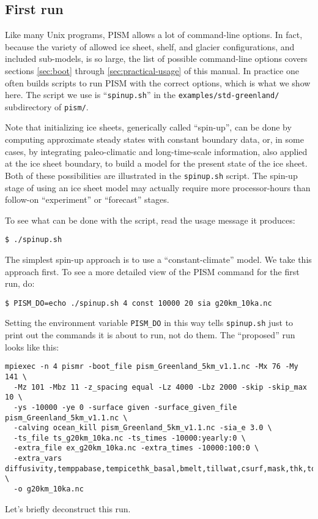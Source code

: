 \subsection{First run}   \label{subsect:runscript}  Like many Unix programs, PISM allows a lot of command-line options.  In fact, because the variety of allowed ice sheet, shelf, and glacier configurations, and included sub-models, is so large, the list of possible command-line options covers sections \ref{sec:boot} through \ref{sec:practical-usage} of this manual.  In practice one often builds scripts to run PISM with the correct options, which is what we show here.  The script we use is ``\texttt{spinup.sh}'' in the \texttt{examples/std-greenland/} subdirectory of \texttt{pism/}.

Note that initializing ice sheets, generically called ``spin-up'', can be done by computing approximate steady states with constant boundary data, or, in some cases, by integrating paleo-climatic and long-time-scale information, also applied at the ice sheet boundary, to build a model for the present state of the ice sheet.  Both of these possibilities are illustrated in the \texttt{spinup.sh} script.  The spin-up stage of using an ice sheet model may actually require more processor-hours than follow-on ``experiment'' or ``forecast'' stages.

To see what can be done with the script, read the usage message it produces:
\begin{verbatim}
$ ./spinup.sh
\end{verbatim}

The simplest spin-up approach is to use a ``constant-climate'' model.  We take this approach first.  To see a more detailed view of the PISM command for the first run, do:
\begin{verbatim}
$ PISM_DO=echo ./spinup.sh 4 const 10000 20 sia g20km_10ka.nc
\end{verbatim}
Setting the environment variable \texttt{PISM_DO} in this way tells \texttt{spinup.sh} just to print out the commands it is about to run, not do them.  The ``proposed'' run looks like this:
\label{firstcommand}
\small
\begin{verbatim}
mpiexec -n 4 pismr -boot_file pism_Greenland_5km_v1.1.nc -Mx 76 -My 141 \
  -Mz 101 -Mbz 11 -z_spacing equal -Lz 4000 -Lbz 2000 -skip -skip_max 10 \
  -ys -10000 -ye 0 -surface given -surface_given_file pism_Greenland_5km_v1.1.nc \
  -calving ocean_kill pism_Greenland_5km_v1.1.nc -sia_e 3.0 \
  -ts_file ts_g20km_10ka.nc -ts_times -10000:yearly:0 \
  -extra_file ex_g20km_10ka.nc -extra_times -10000:100:0 \
  -extra_vars diffusivity,temppabase,tempicethk_basal,bmelt,tillwat,csurf,mask,thk,topg,usurf \
  -o g20km_10ka.nc
\end{verbatim}
\normalsize
Let's briefly deconstruct this run.

